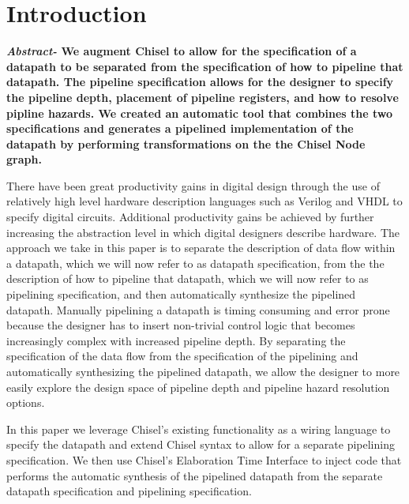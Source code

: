\section{Introduction}
{\bf {\it Abstract- }} {\bf We augment Chisel to allow for the specification of a datapath to be separated from the specification of how to pipeline that datapath. The pipeline specification allows for the designer to specify the pipeline depth, placement of pipeline registers, and how to resolve pipline hazards. We created an automatic tool that combines the two specifications and generates a pipelined implementation of the datapath by performing transformations on the the Chisel Node graph.}

There have been great productivity gains in digital design through the use of relatively high level hardware description languages such as Verilog and VHDL to specify digital circuits. Additional productivity gains be achieved by further increasing the abstraction level in which digital designers describe hardware. The approach we take in this paper is to separate the description of data flow within a datapath, which we will now refer to as datapath specification, from the the description of how to pipeline that datapath, which we will now refer to as pipelining specification, and then automatically synthesize the pipelined datapath. Manually pipelining a datapath is timing consuming and error prone because the designer has to insert non-trivial control logic that becomes increasingly complex with increased pipeline depth. By separating the specification of the data flow from the specification of the pipelining and automatically synthesizing the pipelined datapath, we allow the designer to more easily explore the design space of pipeline depth and pipeline hazard resolution options. 

In this paper we leverage Chisel's existing functionality as a wiring language to specify the datapath and extend Chisel syntax to allow for a separate pipelining specification. We then use Chisel's Elaboration Time Interface to inject code that performs the automatic synthesis of the pipelined datapath from the separate datapath specification and pipelining specification.

